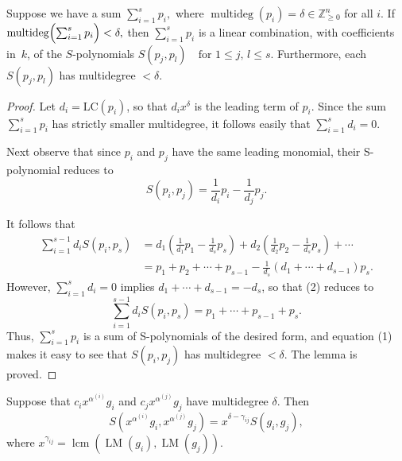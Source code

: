 \begin{lemma}\label{lem:Spolynomial_syzygy_of_degree_cancellation} %
    \leanok %
    Suppose we have a sum $\sum_{i=1}^s p_i,$ where $\operatorname{multideg}(p_i)=\delta\in\mathbb Z_{\ge0}^n$ for all $i$.
    If $\operatorname{multideg}\Bigl(\sum_{i=1}^s p_i\Bigr)<\delta,$ then $\sum_{i=1}^s p_i$ is a linear combination, with coefficients in~$k$, of the $S$-polynomials $S(p_j,p_l)\quad\text{for }1\le j,\,l\le s$.
    Furthermore, each $S(p_j,p_l)$ has multidegree $<\delta$.
\end{lemma}
\begin{proof}
  \leanok
  Let $d_i = \text{LC}(p_i)$, so that $d_i x^\delta$ is the leading term of $p_i$. Since the sum $\sum_{i=1}^s p_i$ has strictly smaller multidegree, it follows easily that $\sum_{i=1}^s d_i = 0$.

  Next observe that since $p_i$ and $p_j$ have the same leading monomial, their S-polynomial reduces to
  \begin{equation} \tag{1}
  S(p_i, p_j) = \frac{1}{d_i}p_i - \frac{1}{d_j}p_j.
  \end{equation}

  It follows that
  \begin{equation} \tag{2}
  \begin{aligned}
  \sum_{i=1}^{s-1} d_i S(p_i, p_s) &= d_1\left(\frac{1}{d_1}p_1 - \frac{1}{d_s}p_s\right) + d_2\left(\frac{1}{d_2}p_2 - \frac{1}{d_s}p_s\right) + \cdots \\
  &= p_1 + p_2 + \cdots + p_{s-1} - \frac{1}{d_s}(d_1 + \cdots + d_{s-1})p_s.
  \end{aligned}
  \end{equation}
  However, $\sum_{i=1}^s d_i = 0$ implies $d_1 + \cdots + d_{s-1} = -d_s$, so that (2) reduces to
  \[
  \sum_{i=1}^{s-1} d_i S(p_i, p_s) = p_1 + \cdots + p_{s-1} + p_s.
  \]
  Thus, $\sum_{i=1}^s p_i$ is a sum of S-polynomials of the desired form, and equation (1) makes it easy to see that $S(p_i, p_j)$ has multidegree $<\delta$. The lemma is proved.
\end{proof}

\begin{lemma}\label{lem:S-polynomials_and_Monomial_Multiplication} %
  \leanok %
  Suppose that $c_i x^{\alpha^{(i)}} g_i$ and $c_j x^{\alpha^{(j)}} g_j$ have multidegree $\delta$. Then
  \[
  S(x^{\alpha^{(i)}} g_i, x^{\alpha^{(j)}} g_j) = x^{\delta - \gamma_{ij}} S(g_i, g_j),
  \]
  where $x^{\gamma_{ij}} = \operatorname{lcm}(\operatorname{LM}(g_i), \operatorname{LM}(g_j))$.
\end{lemma}


